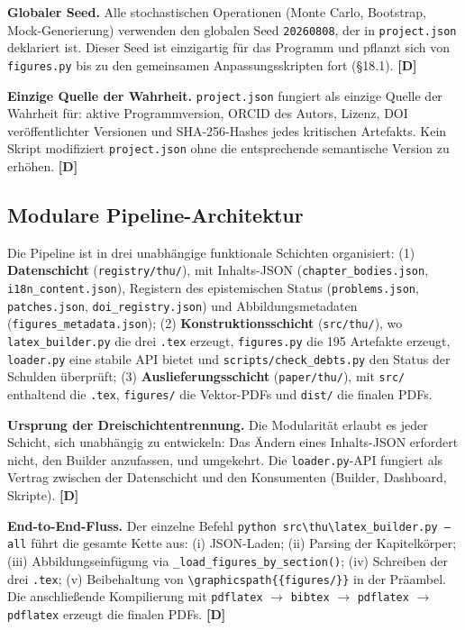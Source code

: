 ﻿\documentclass[11pt,letterpaper]{article}
\begin{document}
\textbf{Globaler Seed.} Alle stochastischen Operationen (Monte Carlo, Bootstrap, Mock-Generierung) verwenden den globalen Seed \texttt{20260808}, der in \texttt{project.json} deklariert ist. Dieser Seed ist einzigartig für das Programm und pflanzt sich von \texttt{figures.py} bis zu den gemeinsamen Anpassungsskripten fort (§18.1). \textbf{[D]}

\textbf{Einzige Quelle der Wahrheit.} \texttt{project.json} fungiert als einzige Quelle der Wahrheit für: aktive Programmversion, ORCID des Autors, Lizenz, DOI veröffentlichter Versionen und SHA-256-Hashes jedes kritischen Artefakts. Kein Skript modifiziert \texttt{project.json} ohne die entsprechende semantische Version zu erhöhen. \textbf{[D]}
\subsection{Modulare Pipeline-Architektur}
Die Pipeline ist in drei unabhängige funktionale Schichten organisiert: (1) \textbf{Datenschicht} (\texttt{registry/thu/}), mit Inhalts-JSON (\texttt{chapter\_bodies.json}, \texttt{i18n\_content.json}), Registern des epistemischen Status (\texttt{problems.json}, \texttt{patches.json}, \texttt{doi\_registry.json}) und Abbildungsmetadaten (\texttt{figures\_metadata.json}); (2) \textbf{Konstruktionsschicht} (\texttt{src/thu/}), wo \texttt{latex\_builder.py} die drei \texttt{.tex} erzeugt, \texttt{figures.py} die 195 Artefakte erzeugt, \texttt{loader.py} eine stabile API bietet und \texttt{scripts/check\_debts.py} den Status der Schulden überprüft; (3) \textbf{Auslieferungsschicht} (\texttt{paper/thu/}), mit \texttt{src/} enthaltend die \texttt{.tex}, \texttt{figures/} die Vektor-PDFs und \texttt{dist/} die finalen PDFs.

\textbf{Ursprung der Dreischichtentrennung.} Die Modularität erlaubt es jeder Schicht, sich unabhängig zu entwickeln: Das Ändern eines Inhalts-JSON erfordert nicht, den Builder anzufassen, und umgekehrt. Die \texttt{loader.py}-API fungiert als Vertrag zwischen der Datenschicht und den Konsumenten (Builder, Dashboard, Skripte). \textbf{[D]}

\textbf{End-to-End-Fluss.} Der einzelne Befehl \texttt{python src\textbackslash thu\textbackslash latex\_builder.py --all} führt die gesamte Kette aus: (i) JSON-Laden; (ii) Parsing der Kapitelkörper; (iii) Abbildungseinfügung via \texttt{\_load\_figures\_by\_section()}; (iv) Schreiben der drei \texttt{.tex}; (v) Beibehaltung von \texttt{\textbackslash graphicspath\{\{figures/\}\}} in der Präambel. Die anschließende Kompilierung mit \texttt{pdflatex} $\to$ \texttt{bibtex} $\to$ \texttt{pdflatex} $\to$ \texttt{pdflatex} erzeugt die finalen PDFs. \textbf{[D]}
\end{document}
